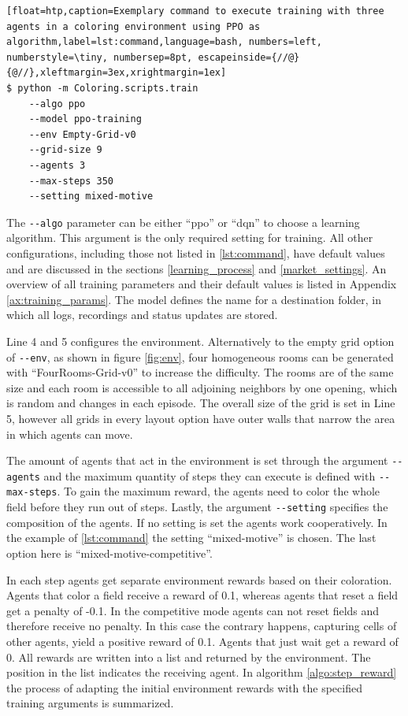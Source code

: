 \begin{lstlisting}[float=htp,caption=Exemplary command to execute training with three agents in a coloring environment using PPO as algorithm,label=lst:command,language=bash, numbers=left, numberstyle=\tiny, numbersep=8pt, escapeinside={//@}{@//},xleftmargin=3ex,xrightmargin=1ex]
$ python -m Coloring.scripts.train
    --algo ppo
    --model ppo-training
    --env Empty-Grid-v0 
    --grid-size 9 
    --agents 3 
    --max-steps 350
    --setting mixed-motive
\end{lstlisting}

The \verb|--algo| parameter can be either ``ppo'' or ``dqn'' to choose a learning algorithm. This argument is the only required setting for training. All other configurations, including those not listed in \ref{lst:command}, have default values and are discussed in the sections \ref{learning_process} and \ref{market_settings}. An overview of all training parameters and their default values is listed in Appendix \ref{ax:training_params}. The model defines the name for a destination folder, in which all logs, recordings and status updates are stored.

Line 4 and 5 configures the environment. Alternatively to the empty grid option of \verb|--env|, as shown in figure \ref{fig:env}, four homogeneous rooms can be generated with ``FourRooms-Grid-v0'' to increase the difficulty. The rooms are of the same size and each room is accessible to all adjoining neighbors by one opening, which is random and changes in each episode. The overall size of the grid is set in Line 5, however all grids in every layout option have outer walls that narrow the area in which agents can move.

The amount of agents that act in the environment is set through the argument \verb|--agents| and the maximum quantity of steps they can execute is defined with \verb|--max-steps|. To gain the maximum reward, the agents need to color the whole field before they run out of steps. Lastly, the argument \verb|--setting| specifies the composition of the agents. If no setting is set the agents work cooperatively. In the example of \ref{lst:command} the setting ``mixed-motive'' is chosen. The last option here is ``mixed-motive-competitive''. %

In each step agents get separate environment rewards based on their coloration. Agents that color a field receive a reward of 0.1, whereas agents that reset a field get a penalty of -0.1. In the competitive mode agents can not reset fields and therefore receive no penalty. In this case the contrary happens, capturing cells of other agents, yield a positive reward of 0.1. Agents that just wait get a reward of 0. All rewards are written into a list and returned by the environment. The position in the list indicates the receiving agent. In algorithm \ref{algo:step_reward} the process of adapting the initial environment rewards with the specified training arguments is summarized.

